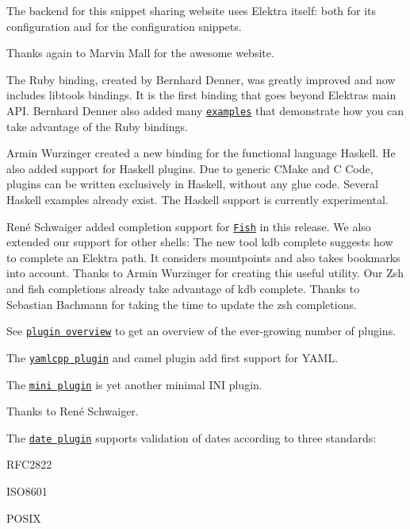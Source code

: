 The backend for this snippet sharing website uses Elektra itself\+: both for its configuration and for the configuration snippets.

Thanks again to Marvin Mall for the awesome website.

The Ruby binding, created by Bernhard Denner, was greatly improved and now includes libtools bindings. It is the first binding that goes beyond Elektra\textquotesingle{}s main A\+PI. Bernhard Denner also added many \href{https://master.libelektra.org/src/bindings/swig/ruby/examples}{\tt examples} that demonstrate how you can take advantage of the Ruby bindings.

Armin Wurzinger created a new binding for the functional language Haskell. He also added support for Haskell plugins. Due to generic C\+Make and C Code, plugins can be written exclusively in Haskell, without any glue code. Several Haskell examples already exist. The Haskell support is currently experimental.

René Schwaiger added completion support for \href{http://fishshell.com}{\tt Fish} in this release. We also extended our support for other shells\+: The new tool {\ttfamily kdb complete} suggests how to complete an Elektra path. It considers mountpoints and also takes bookmarks into account. Thanks to Armin Wurzinger for creating this useful utility. Our Zsh and fish completions already take advantage of {\ttfamily kdb complete}. Thanks to Sebastian Bachmann for taking the time to update the {\ttfamily zsh} completions.

See \href{https://www.libelektra.org/plugins/}{\tt plugin overview} to get an overview of the ever-\/growing number of plugins.

The \href{https://www.libelektra.org/plugins/yamlcpp}{\tt yamlcpp plugin} and camel plugin add first support for Y\+A\+ML.

The \href{https://www.libelektra.org/plugins/mini}{\tt mini plugin} is yet another minimal I\+NI plugin.

Thanks to René Schwaiger.

The \href{https://www.libelektra.org/plugins/date}{\tt date plugin} supports validation of dates according to three standards\+:


\begin{DoxyItemize}
\item {\ttfamily R\+F\+C2822}
\item {\ttfamily I\+S\+O8601}
\item {\ttfamily P\+O\+S\+IX}
\end{DoxyItemize}

